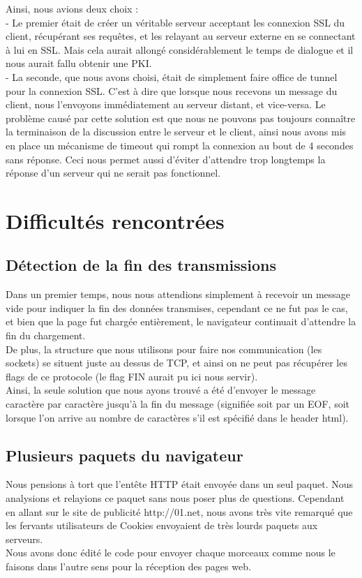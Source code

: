 \documentclass{scrreprt}
\begin{document}
Ainsi, nous avions deux choix :\\
- Le premier était de créer un véritable serveur acceptant les connexion SSL du client, récupérant ses requêtes, et les relayant au serveur externe en se connectant à lui en SSL. Mais cela aurait allongé considérablement le temps de dialogue et il nous aurait fallu obtenir une PKI.\\
- La seconde, que nous avons choisi, était de simplement faire office de tunnel pour la connexion SSL. C'est à dire que lorsque nous recevons un message du client, nous l'envoyons immédiatement au serveur distant, et vice-versa. Le problème causé par cette solution est que nous ne pouvons pas toujours connaître la terminaison de la discussion entre le serveur et le client, ainsi nous avons mis en place un mécanisme de timeout qui rompt la connexion au bout de 4 secondes sans réponse. Ceci nous permet aussi d'éviter d'attendre trop longtemps la réponse d'un serveur qui ne serait pas fonctionnel.


\section{Difficultés rencontrées}

\subsection{Détection de la fin des transmissions}
Dans un premier temps, nous nous attendions simplement à recevoir un message vide pour indiquer la fin des données transmises, cependant ce ne fut pas le cas, et bien que la page fut chargée entièrement, le navigateur continuait d'attendre la fin du chargement. \\
De plus, la structure que nous utilisons pour faire nos communication (les sockets) se situent juste au dessus de TCP, et ainsi on ne peut pas récupérer les flags de ce protocole (le flag FIN aurait pu ici nous servir).\\
Ainsi, la seule solution que nous ayons trouvé a été d'envoyer le message caractère par caractère jusqu'à la fin du message (signifiée soit par un EOF, soit lorsque l'on arrive au nombre de caractères s'il est spécifié dans le header html).

\subsection{Plusieurs paquets du navigateur}
Nous pensions à tort que l'entête HTTP était envoyée dans un seul paquet. Nous analysions et relayions ce paquet sans nous poser plus de questions. Cependant en allant sur le site de publicité http://01.net, nous avons très vite remarqué que les fervants utilisateurs de Cookies envoyaient de très lourds paquets aux serveurs.\\
Nous avons donc édité le code pour envoyer chaque morceaux comme nous le faisons dans l'autre sens pour la réception des pages web.
\end{document}
